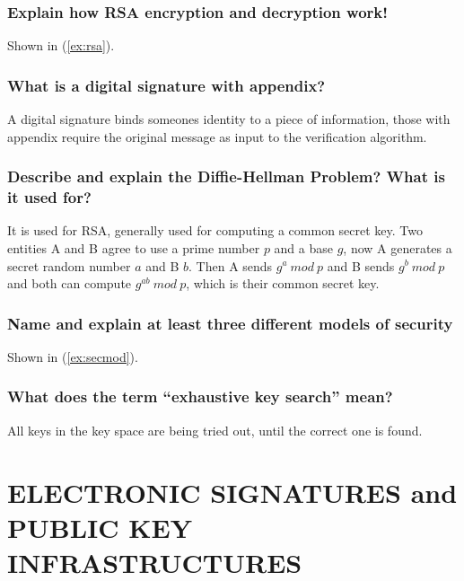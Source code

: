 \documentclass[a4paper, 10 pt, conference]{ieeeconf}
\begin{document}
\subsubsection{\textbf{Explain how RSA encryption and decryption work!}}
Shown in (\ref{ex:rsa}). 

\subsubsection{\textbf{What is a digital signature with appendix?}}
A digital signature binds someones identity to a piece of information, those with appendix require the original message as input to the verification algorithm. 

\subsubsection{\textbf{Describe and explain the Diffie-Hellman Problem? What is it used for?}}
It is used for RSA, generally used for computing a common secret key. Two entities A and B agree to use a prime number $p$ and a base $g$, now A generates a secret random number $a$ and B $b$. Then A sends $g^{a} \ mod \ p$ and B sends $g^{b} \ mod \ p$ and both can compute $g^{ab} \ mod \ p$, which is their common secret key. 

\subsubsection{\textbf{Name and explain at least three different models of security}}
Shown in (\ref{ex:secmod}).

\subsubsection{\textbf{What does the term ``exhaustive key search'' mean?}}
All keys in the key space are being tried out, until the correct one is found. 




\section{\textbf{ELECTRONIC SIGNATURES and PUBLIC KEY INFRASTRUCTURES}}
\end{document}
